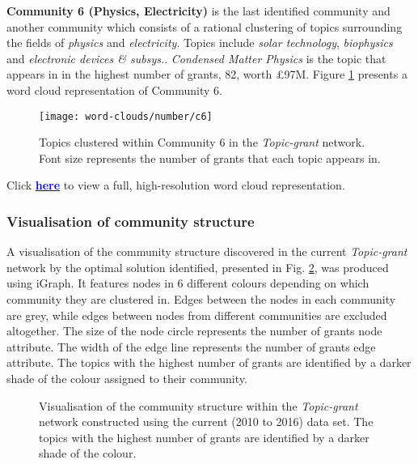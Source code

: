 \noindent\textbf{Community 6 (Physics, Electricity)} is the last identified community and another community which consists of a rational clustering of topics surrounding the fields of \textit{physics} and \textit{electricity}. Topics include \textit{solar technology}, \textit{biophysics} and \textit{electronic devices \& subsys.}. \textit{Condensed Matter Physics} is the topic that appears in in the highest number of grants, 82, worth \pounds97M. Figure \ref{figure:topic_a_current_number_c6} presents a word cloud representation of Community 6.

\begin{figure}[!htbp]
    \centering
    \texttt{[image: word-clouds/number/c6]}
    \caption[Topics clustered within Community 6 in the \textit{Topic-grant} network]{Topics clustered within Community 6 in the \textit{Topic-grant} network. Font size represents the number of grants that each topic appears in.}
    \label{figure:topic_a_current_number_c6}
\end{figure}

\noindent Click \href{https://raw.githubusercontent.com/SergiuTripon/msc-thesis-na-epsrc/master/wiki/word-clouds/png/number/communities/modified/full.png?token=AJsbI8Ehc-UcfUTnOVKrCSgHqfUe3IoPks5X27kGwA\%3D\%3D}{\textcolor{blue}{\textbf{here}}} to view a full, high-resolution word cloud representation.

\clearpage

\subsubsection{Visualisation of community structure}

A visualisation of the community structure discovered in the current \textit{Topic-grant} network by the optimal solution identified, presented in Fig. \ref{figure:topic_a_current_cs}, was produced using iGraph. It features nodes in 6 different colours depending on which community they are clustered in. Edges between the nodes in each community are grey, while edges between nodes from different communities are excluded altogether. The size of the node circle represents the number of grants node attribute. The width of the edge line represents the number of grants edge attribute. The topics with the highest number of grants are identified by a darker shade of the colour assigned to their community.

\begin{figure}[htpb]
    \centering
    \caption[Visualisation of the community structure within the \textit{Topic-grant} network constructed using the current (2010 to 2016) data set.]{Visualisation of the community structure within the \textit{Topic-grant} network constructed using the current (2010 to 2016) data set. The topics with the highest number of grants are identified by a darker shade of the colour.}
    \label{figure:topic_a_current_cs}
\end{figure}

